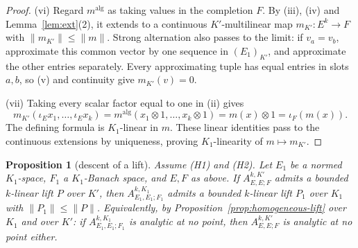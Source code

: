 \documentclass[11pt]{amsart}
\newtheorem{proposition}[theorem]{Proposition}
\theoremstyle{definition}
\theoremstyle{remark}
\numberwithin{equation}{section}
\newcommand{\norm}[1]{\lVert #1\rVert}
\theoremstyle{plain}
\theoremstyle{definition}
\theoremstyle{plain}
\begin{document}
\begin{proof}
\textup{(vi)} Regard $m^{\mathrm{alg}}$ as taking values in the completion $F$.
By \textup{(iii)}, \textup{(iv)} and Lemma~\ref{lem:ext}(2), it extends to a continuous
$K'$\nobreakdash-multilinear map $m_{K'}\colon E^k\to F$ with $\norm{m_{K'}}\le\norm m$.
Strong alternation also passes to the limit: if $v_a=v_b$, approximate this common vector by one sequence in
$(E_1)_{K'}$, and approximate the other entries separately. Every approximating tuple has equal entries in
slots $a,b$, so \textup{(v)} and continuity give $m_{K'}(v)=0$.

\textup{(vii)} Taking every scalar factor equal to one in \textup{(ii)} gives
\[
m_{K'}(\iota_Ex_1,\dots,\iota_Ex_k)
=m^{\mathrm{alg}}(x_1\otimes1,\dots,x_k\otimes1)
=m(x)\otimes1=\iota_F(m(x)).
\]
The defining formula is $K_1$\nobreakdash-linear in $m$. These linear identities pass to the continuous
extensions by uniqueness, proving $K_1$\nobreakdash-linearity of $m\mapsto m_{K'}$.
\end{proof}

\begin{proposition}[descent of a lift]\label{prop:ascent}
Assume \textup{(H1)} and \textup{(H2)}. Let $E_1$ be a normed $K_1$\nobreakdash-space, $F_1$ a $K_1$\nobreakdash-Banach space, and $E,F$ as
above. If $A^{k,K'}_{E,E;F}$ admits a bounded $k$\nobreakdash-linear lift $P$ over $K'$, then $A^{k,K_1}_{E_1,E_1;F_1}$ admits a
bounded $k$\nobreakdash-linear lift $P_1$ over $K_1$ with $\norm{P_1}\le\norm P$. Equivalently, by Proposition~\ref{prop:homogeneous-lift} over $K_1$ and over
$K'$: if $A^{k,K_1}_{E_1,E_1;F_1}$ is analytic at no point, then $A^{k,K'}_{E,E;F}$ is analytic at no point either.
\end{proposition}
\end{document}
